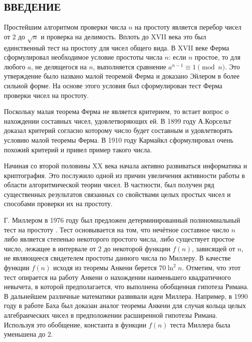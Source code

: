 \documentclass[_00_dissertation.tex]{subfiles}
\begin{document}
\onlyinsubfile{
    \renewcommand{\contentsname}{ОГЛАВЛЕНИЕ}
    \setcounter{tocdepth}{3}
    \tableofcontents
}

\newpage
\begin{center}
    \section*{ВВЕДЕНИЕ}
\end{center}

Простейшим алгоритмом проверки числа $n$ на простоту является перебор чисел от $2$ до $\sqrt{n}$ и проверка на делимость.
Вплоть до XVII века это был единственный тест на простоту для чисел общего вида.
В XVII веке Ферма сформулировал необходимое условие простоты числа $n$: если $n$ простое, то для любого $a$, не делящегося на $n$, выполняется сравнение $a^{n-1} \equiv 1{\pmod{n}}$.
Это утверждение было названо малой теоремой Ферма и доказано Эйлером в более сильной форме.
На основе этого условия был сформулирован тест Ферма проверки чисел на простоту.

Поскольку малая теорема Ферма не является критерием, то встает вопрос о нахождении составных чисел, удовлетворяющих ей.
В 1899 году А.Корсельт доказал критерий согласно которому число будет составным и удовлетворять условию малой теоремы Ферма.
В 1910 году Кармайкл сформулировал очень похожий критерий и привел пример такого числа.

Начиная со второй половины XX века начала активно развиваться информатика и криптография.
Это послужило одной из причин увеличения активности работы в области алгоритмической теории чисел.
В частности, был получен ряд существенных результатов связанных со свойствами целых простых чисел и способами проверки их на простоту.

Г. Миллером в 1976 году был предложен детерминированный полиномиальный тест на простоту \cite{source:Miller}.
Тест основывается на том, что нечётное составное число $n$ либо является степенью некоторого простого числа, либо существует простое число, лежащее в интервале от $2$ до некоторой функции $f(n)$, зависящей от $n$, не являющееся свидетелем простоты данного числа по Миллеру.
В качестве функции $f(n)$ исходя из теоремы Анкени берется $70 \ln^2 n$.
Отметим, что этот тест опирается на работу Анкени о нахождении наименьшего квадратичного невычета, в которой предполагается, что выполнена обобщенная гипотеза Римана.
В дальнейшем различные математики развивали идеи Миллера.
Например, в 1990 году в работе Баха \cite{source:Bach} был доказан аналог теоремы Анкени для случая кольца целых алгебраических чисел в предположении расширенной гипотезы Римана.
Используя это обобщение, константа в функции $f(n)$ теста Миллера была уменьшена до $2$.
\end{document}
